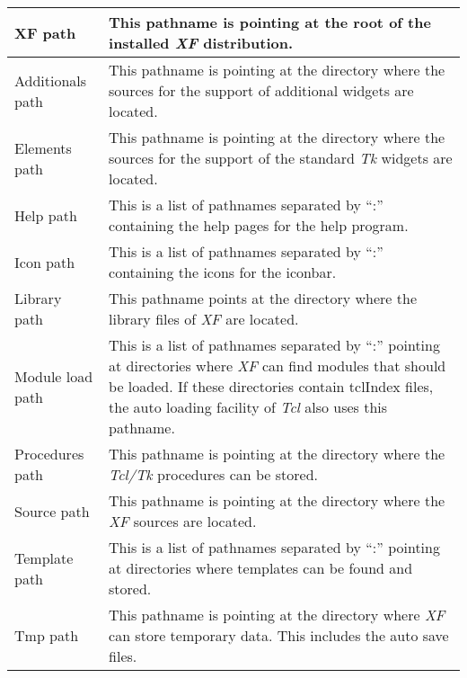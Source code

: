 {\newpage
\clearpage
\samepage \begin{supertabular}{|l|p{7.8cm}|}
XF path           & This pathname is pointing at the root of
                    the installed {\em XF }
 distribution.\\  \hline
Additionals path  & This pathname is pointing at the
                    directory where the sources for the
                    support of additional widgets are
                    located.\\  \hline
Elements path     & This pathname is pointing at the
                    directory where the sources for the
                    support of the standard {\em Tk }
 widgets are
                    located.\\  \hline
Help path         & This is a list of pathnames separated by
                    ``:'' containing the help pages for
                    the help program.\\  \hline 
Icon path         & This is a list of pathnames separated by
                    ``:'' containing the icons for the
                    iconbar.\\  \hline
Library path      & This pathname points at the directory
                    where the library files of {\em XF }
 are
                    located.\\  \hline
Module load path  & This is a list of pathnames separated by
                    ``:'' pointing at directories where
                    {\em XF }
 can find modules that should be
                    loaded. If these directories contain
                    tclIndex files, the auto loading
                    facility of {\em Tcl }
 also uses this
                    pathname.\\  \hline
Procedures path   & This pathname is pointing at the
                    directory where the {\em Tcl/Tk }
 procedures
                    can be stored.\\  \hline
Source path       & This pathname is pointing at the 
                    directory where the {\em XF }
 sources are
                    located.\\  \hline
Template path     & This is a list of pathnames separated by
                    ``:'' pointing at directories where
                    templates can be found and stored.\\  \hline
Tmp path          & This pathname is pointing at the 
                    directory where {\em XF }
 can store temporary
                    data. This includes the auto save
                    files.\\  \hline

\end{supertabular}}
